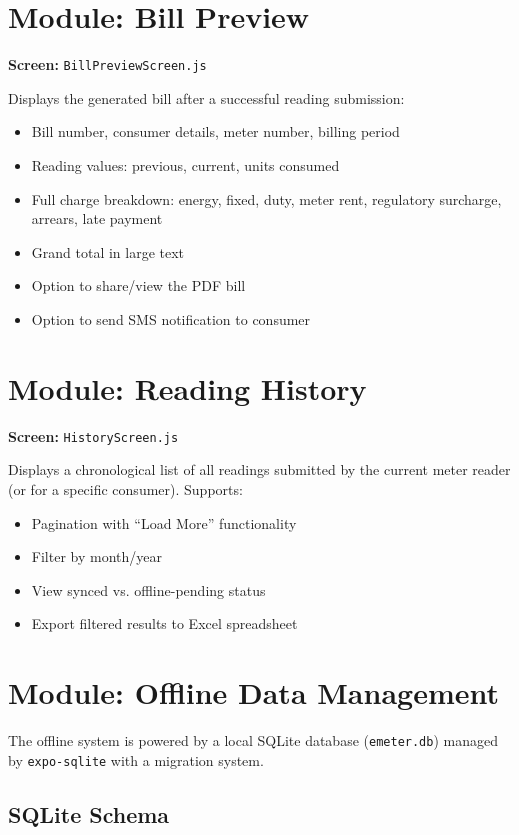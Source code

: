 \documentclass[12pt, a4paper]{report}
\newenvironment{featurelist}{%
    \begin{itemize}[leftmargin=1.5em, itemsep=2pt, parsep=0pt]
}{%
    \end{itemize}
}
\begin{document}
\section{Module: Bill Preview}

\textbf{Screen:} \texttt{BillPreviewScreen.js}

Displays the generated bill after a successful reading submission:
\begin{featurelist}
    \item Bill number, consumer details, meter number, billing period
    \item Reading values: previous, current, units consumed
    \item Full charge breakdown: energy, fixed, duty, meter rent, regulatory surcharge, arrears, late payment
    \item Grand total in large text
    \item Option to share/view the PDF bill
    \item Option to send SMS notification to consumer
\end{featurelist}

\section{Module: Reading History}

\textbf{Screen:} \texttt{HistoryScreen.js}

Displays a chronological list of all readings submitted by the current meter reader (or for a specific consumer). Supports:
\begin{featurelist}
    \item Pagination with ``Load More'' functionality
    \item Filter by month/year
    \item View synced vs. offline-pending status
    \item Export filtered results to Excel spreadsheet
\end{featurelist}

\section{Module: Offline Data Management}

The offline system is powered by a local SQLite database (\texttt{emeter.db}) managed by \texttt{expo-sqlite} with a migration system.

\subsection{SQLite Schema}
\end{document}
